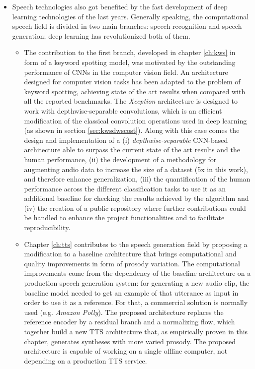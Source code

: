 \begin{itemize}
\item Speech technologies also got benefited by the fast development of deep learning technologies of the last years. Generally speaking, the computational speech field is divided in two main branches: speech recognition and speech generation; deep learning has revolutionized both of them. 
	\begin{itemize}
		\item The contribution to the first branch, developed in chapter \ref{ch:kws} in form of a keyword spotting model, was motivated by the outstanding performance of CNNs in the computer vision field. An architecture designed for computer vision tasks has been adapted to the problem of keyword spotting, achieving state of the art results when compared with all the reported benchmarks. The \textit{Xception} architecture is designed to work with depthwise-separable convolutions, which is an efficient modification of the classical convolution operations used in deep learning (as shown in section \ref{sec:kwsdwscost}). Along with this case comes the design and implementation of a (i) \textit{depthwise-separable} CNN-based architecture able to surpass the current state of the art results and the human performance, (ii) the development of a methodology for augmenting audio data to increase the size of a dataset (5x in this work), and therefore enhance generalization, (iii) the quantification of the human performance across the different classification tasks to use it as an additional baseline for checking the results achieved by the algorithm and (iv) the creation of a public repository where further contributions could be handled to enhance the project functionalities and to facilitate reproducibility.
		\item Chapter \ref{ch:tts} contributes to the speech generation field by proposing a modification to a baseline architecture that brings computational and quality improvements in form of prosody variation. The computational improvements come from the dependency of the baseline architecture on a production speech generation system: for generating a new audio clip, the baseline model needed to get an example of that utterance as input in order to use it as a reference. For that, a commercial solution is normally used (e.g. \textit{Amazon Polly}). The proposed architecture replaces the reference encoder by a residual branch and a normalizing flow, which together build a new TTS architecture that, as empirically proven in this chapter, generates syntheses with more varied prosody. The proposed architecture is capable of working on a single offline computer, not depending on a production TTS service. 
	\end{itemize}
\end{itemize}

